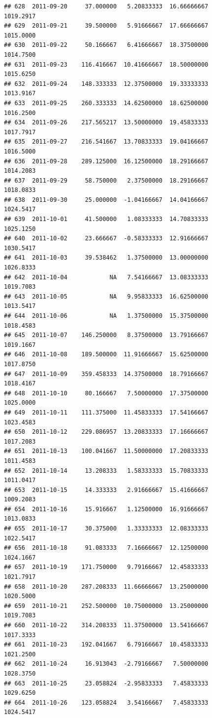 \documentclass[
]{article}
\begin{document}
\begin{verbatim}
## 628  2011-09-20     37.000000   5.20833333  16.66666667    1019.2917
## 629  2011-09-21     39.500000   5.91666667  17.66666667    1015.0000
## 630  2011-09-22     50.166667   6.41666667  18.37500000    1014.7500
## 631  2011-09-23    116.416667  10.41666667  18.50000000    1015.6250
## 632  2011-09-24    148.333333  12.37500000  19.33333333    1013.9167
## 633  2011-09-25    260.333333  14.62500000  18.62500000    1016.2500
## 634  2011-09-26    217.565217  13.50000000  19.45833333    1017.7917
## 635  2011-09-27    216.541667  13.70833333  19.04166667    1016.5000
## 636  2011-09-28    289.125000  16.12500000  18.29166667    1014.2083
## 637  2011-09-29     58.750000   2.37500000  18.29166667    1018.0833
## 638  2011-09-30     25.000000  -1.04166667  14.04166667    1024.5417
## 639  2011-10-01     41.500000   1.08333333  14.70833333    1025.1250
## 640  2011-10-02     23.666667  -0.58333333  12.91666667    1030.5417
## 641  2011-10-03     39.538462   1.37500000  13.00000000    1026.8333
## 642  2011-10-04            NA   7.54166667  13.08333333    1019.7083
## 643  2011-10-05            NA   9.95833333  16.62500000    1013.5417
## 644  2011-10-06            NA   1.37500000  15.37500000    1018.4583
## 645  2011-10-07    146.250000   8.37500000  13.79166667    1019.1667
## 646  2011-10-08    189.500000  11.91666667  15.62500000    1017.8750
## 647  2011-10-09    359.458333  14.37500000  18.79166667    1018.4167
## 648  2011-10-10     80.166667   7.50000000  17.37500000    1025.0000
## 649  2011-10-11    111.375000  11.45833333  17.54166667    1023.4583
## 650  2011-10-12    229.086957  13.20833333  17.16666667    1017.2083
## 651  2011-10-13    100.041667  11.50000000  17.20833333    1011.4583
## 652  2011-10-14     13.208333   1.58333333  15.70833333    1011.0417
## 653  2011-10-15     14.333333   2.91666667  15.41666667    1009.2083
## 654  2011-10-16     15.916667   1.12500000  16.91666667    1013.0833
## 655  2011-10-17     30.375000   1.33333333  12.08333333    1022.5417
## 656  2011-10-18     91.083333   7.16666667  12.12500000    1024.1667
## 657  2011-10-19    171.750000   9.79166667  12.45833333    1021.7917
## 658  2011-10-20    287.208333  11.66666667  13.25000000    1020.5000
## 659  2011-10-21    252.500000  10.75000000  13.25000000    1019.7083
## 660  2011-10-22    314.208333  11.37500000  13.54166667    1017.3333
## 661  2011-10-23    192.041667   6.79166667  10.45833333    1021.2500
## 662  2011-10-24     16.913043  -2.79166667   7.50000000    1028.3750
## 663  2011-10-25     23.058824  -2.95833333   7.45833333    1029.6250
## 664  2011-10-26    123.058824   3.54166667   7.45833333    1024.5417

\end{verbatim}
\end{document}
